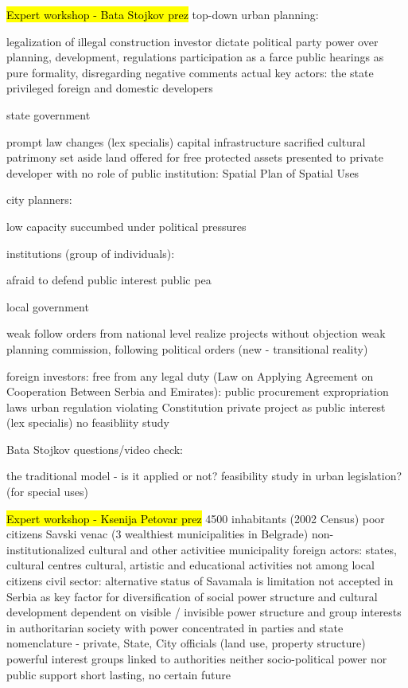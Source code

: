\documentclass[11pt]{report}
\begin{document}
\hl{Expert workshop - Bata Stojkov prez}
top-down urban planning:

    legalization of illegal construction
    investor dictate
    political party power over planning, development, regulations
    participation as a farce
    public hearings as pure formality, disregarding negative comments
    actual key actors:
        the state
        privileged foreign and domestic developers

    state government

    prompt law changes (lex specialis)
    capital infrastructure sacrified
    cultural patrimony set aside
    land offered for free
    protected assets presented to private developer with no role of public institution: Spatial Plan of Spatial Uses

    city planners:

    low capacity
    succumbed under political pressures

institutions (group of individuals):

    afraid to defend public interest
    public pea

    local government

    weak
    follow orders from national level
    realize projects without objection
    weak planning commission, following political orders (new - transitional reality)

foreign  investors:
    free from any legal duty (Law on Applying Agreement on Cooperation Between Serbia and Emirates):
        public procurement
        expropriation
        laws
        urban regulation
    violating Constitution
    private project as public interest (lex specialis)
    no feasibliity study

Bata Stojkov questions/video check:

    the traditional model - is it applied or not?
    feasibility study in urban legislation? (for special uses)
    
\hl{Expert workshop - Ksenija Petovar prez}
4500 inhabitants (2002 Census)
poor citizens
Savski venac (3 wealthiest municipalities in Belgrade)
non-institutionalized cultural and other activitiee 
    municipality
    foreign actors: states, cultural centres
    cultural, artistic and educational activities
    not among local citizens
civil sector:
    alternative status of Savamala is limitation
    not accepted in Serbia  as key factor for diversification of social power structure and cultural development
    dependent on visible / invisible power structure and group interests in authoritarian society with power concentrated in parties and state nomenclature - private, State, City officials (land use, property structure)
    powerful interest groups linked to authorities
    neither socio-political power nor public support
    short lasting, no certain future
    
\end{document}
